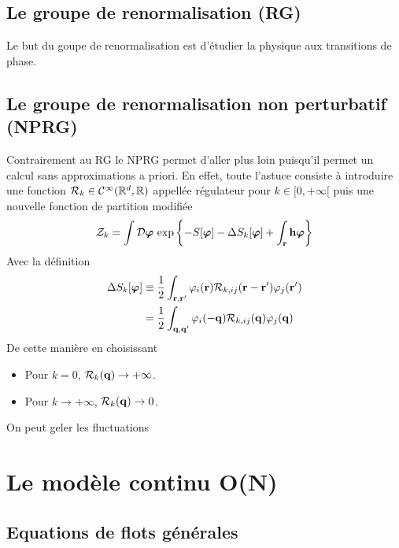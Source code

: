 \documentclass[10pt]{article}
\begin{document}
\begin{multicols}{2}
\vspace*{11pt}
\subsection{Le groupe de renormalisation (RG)}
Le but du goupe de renormalisation est d'étudier la physique aux transitions de phase. 
\vspace*{11pt}
\subsection{Le groupe de renormalisation non perturbatif (NPRG)}
Contrairement au RG le NPRG permet d'aller plus loin puisqu'il permet un calcul sans approximations a priori. En effet, toute l'astuce consiste à introduire une fonction $\mathcal{R}_k \in \mathcal{C}^\infty(\mathbb{R}^{d},\mathbb{R})$ appellée régulateur pour $k \in [0, +\infty[$ puis une nouvelle fonction de partition modifiée  
\begin{equation}
  \mathcal{Z}_k = \int \mathcal{D} \boldsymbol{ \varphi} \, \exp\left\{-S[\boldsymbol{ \varphi}] - \Delta S_k[\boldsymbol{ \varphi}] + \int_{{\bf r}} {\bf h} \boldsymbol{ \varphi} \right\} 
\end{equation}
Avec la définition
\begin{equation}
  \begin{split}
  \Delta S_k[\boldsymbol{ \varphi}]  & \equiv \frac{1}{2} \int_{{\bf r}, {\bf r}'} \varphi_i({\bf r}) \mathcal{R}_{k,ij}({\bf r} - {\bf r}') \varphi_j({\bf r}') \\
 & =  \frac{1}{2} \int_{{\bf q}, {\bf q}'} \varphi_i(-{\bf q}) \mathcal{R}_{k,ij}({\bf q}) \varphi_j({\bf q})
\end{split}
\end{equation}
De cette manière en choisissant
\begin{itemize}
  \item Pour $k = 0$, $\mathcal{R}_k({\bf q})  \rightarrow  +\infty$.
  \item Pour $k \rightarrow +\infty$, $\mathcal{R}_k({\bf q}) \rightarrow 0$.
\end{itemize}
On peut geler les fluctuations 



\pagebreak

\section{Le modèle continu O(N)}
\subsection{Equations de flots générales}
\lipsum[1]
\vspace*{11pt}

\end{multicols}
\end{document}
